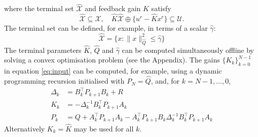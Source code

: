 \documentclass[a4paper, 10 pt, conference]{IEEEconf}
\def\U{\mathcal{U}}
\def\X{\mathcal{X}}
\begin{document}
where the terminal set $\hat{\X}$ and feedback gain $\hat{K}$ satisfy
\begin{equation}\label{eq:termset_feas}
\hat{\X}\subseteq\X, \quad 
\hat{K}\hat{\X}\oplus\{u^r-\hat{K} x^r\}\subseteq \U.
\end{equation}
The terminal set can be defined, for example, in terms of a scalar $\hat{\gamma}$:
\begin{equation}\label{eq:termset_def}
\hat{\X} = \{ x : \lVert x\rVert_{\hat{Q}}^2 \leq \hat{\gamma} \}
\end{equation}
The terminal parameters $\hat{K}$, $\hat{Q}$ and $\hat{\gamma}$ can be computed simultaneously offline by solving a convex optimisation problem (see the Appendix).
%
The gains $\{K_k\}_{k=0}^{N-1}$ in equation \eqref{eq:input} can be computed, for example, using a dynamic programming recursion initialised with $P_N = \hat{Q}$, and, for $k=N-1, \dots , 0$, 
%
\begin{equation}\label{eq:dp}
\begin{aligned}
\Delta_k &= B_k^\top P_{k+1} B_k + R
\\
K_k &= -\Delta_k^{-1} B_k^\top P_{k+1} A_k
\\
P_k &= Q + A_k^\top P_{k+1} A_k - A_k^\top P_{k+1}B_k \Delta_k^{-1} B_k^\top P_{k+1} A_k
\end{aligned}
\end{equation}
Alternatively $K_k=\hat{K}$ may be used for all $k$.
\end{document}
